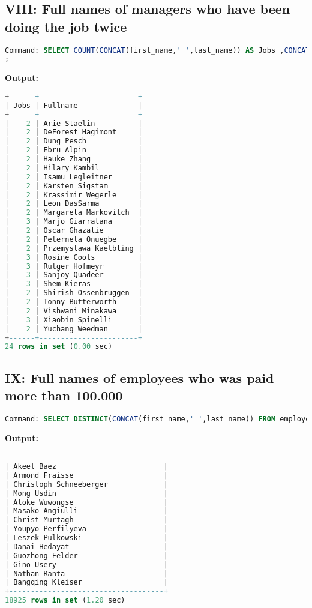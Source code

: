 \documentclass[12pt]{report}
\begin{document}
\subsection*{VIII: Full names of managers who have been doing the job twice}

\begin{lstlisting}[language=sql]
Command: SELECT COUNT(CONCAT(first_name,' ',last_name)) AS Jobs ,CONCAT(first_name,' ',last_name) AS Fullname FROM employees e1 JOIN titles t ON e1.emp_no=t.emp_no JOIN dept_manager dm ON e1.emp_no=dm.emp_no GROUP BY first_name,last_name
;

\end{lstlisting}
\textbf{Output:}
\begin{lstlisting}[language=sql]
+------+-----------------------+
| Jobs | Fullname              |
+------+-----------------------+
|    2 | Arie Staelin          |
|    2 | DeForest Hagimont     |
|    2 | Dung Pesch            |
|    2 | Ebru Alpin            |
|    2 | Hauke Zhang           |
|    2 | Hilary Kambil         |
|    2 | Isamu Legleitner      |
|    2 | Karsten Sigstam       |
|    2 | Krassimir Wegerle     |
|    2 | Leon DasSarma         |
|    2 | Margareta Markovitch  |
|    3 | Marjo Giarratana      |
|    2 | Oscar Ghazalie        |
|    2 | Peternela Onuegbe     |
|    2 | Przemyslawa Kaelbling |
|    3 | Rosine Cools          |
|    3 | Rutger Hofmeyr        |
|    3 | Sanjoy Quadeer        |
|    3 | Shem Kieras           |
|    2 | Shirish Ossenbruggen  |
|    2 | Tonny Butterworth     |
|    2 | Vishwani Minakawa     |
|    3 | Xiaobin Spinelli      |
|    2 | Yuchang Weedman       |
+------+-----------------------+
24 rows in set (0.00 sec)

\end{lstlisting}


\subsection*{IX: Full names of employees who was paid more than 100.000}

\begin{lstlisting}[language=sql]
Command: SELECT DISTINCT(CONCAT(first_name,' ',last_name)) FROM employees e RIGHT JOIN salaries s ON e.emp_no=s.emp_no WHERE s.salary > 100000;
\end{lstlisting}
\textbf{Output:}
\begin{lstlisting}[language=sql]

| Akeel Baez                         |
| Armond Fraisse                     |
| Christoph Schneeberger             |
| Mong Usdin                         |
| Aloke Wuwongse                     |
| Masako Angiulli                    |
| Christ Murtagh                     |
| Youpyo Perfilyeva                  |
| Leszek Pulkowski                   |
| Danai Hedayat                      |
| Guozhong Felder                    |
| Gino Usery                         |
| Nathan Ranta                       |
| Bangqing Kleiser                   |
+------------------------------------+
18925 rows in set (1.20 sec)

\end{lstlisting}
\end{document}
